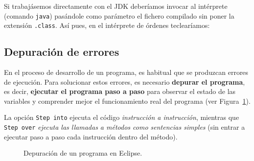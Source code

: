 \documentclass[
  spanish,
  11pt,
  a4paper,
  DIV=11,
  numbers=noendperiod]{scrartcl}
\begin{document}
\begin{tcolorbox}[enhanced jigsaw, toprule=.15mm, coltitle=black, titlerule=0mm, opacitybacktitle=0.6, breakable, colback=white, colframe=quarto-callout-note-color-frame, colbacktitle=quarto-callout-note-color!10!white, opacityback=0, title={Ejecución sin un entorno de desarrollo}, bottomtitle=1mm, rightrule=.15mm, toptitle=1mm, left=2mm, bottomrule=.15mm, leftrule=.75mm, arc=.35mm]

Si trabajásemos directamente con el JDK deberíamos invocar al intérprete (comando \texttt{java}) pasándole como parámetro el fichero compilado sin poner la extensión \texttt{.class}. Así pues, en el intérprete de órdenes teclearíamos:


\end{tcolorbox}

\subsection{Depuración de errores}\label{depuraciuxf3n-de-errores}

En el proceso de desarrollo de un programa, es habitual que se produzcan errores de ejecución. Para solucionar estos errores, es necesario \textbf{depurar el programa}, es decir, \textbf{ejecutar el programa paso a paso} para observar el estado de las variables y comprender mejor el funcionamiento real del programa (ver Figura~\ref{fig-debug_eclipse}).

\begin{tcolorbox}[enhanced jigsaw, toprule=.15mm, coltitle=black, titlerule=0mm, opacitybacktitle=0.6, breakable, colback=white, colframe=quarto-callout-note-color-frame, colbacktitle=quarto-callout-note-color!10!white, opacityback=0, title={Ejecución paso a paso}, bottomtitle=1mm, rightrule=.15mm, toptitle=1mm, left=2mm, bottomrule=.15mm, leftrule=.75mm, arc=.35mm]

La opción \texttt{Step\ into} ejecuta el código \emph{instrucción a instrucción}, mientras que \texttt{Step\ over} \emph{ejecuta las llamadas a métodos como sentencias simples} (sin entrar a ejecutar paso a paso cada instrucción dentro del método).

\end{tcolorbox}

\begin{figure}
\caption{Depuración de un programa en Eclipse.}\label{fig-debug_eclipse}
\end{figure}
\end{document}
